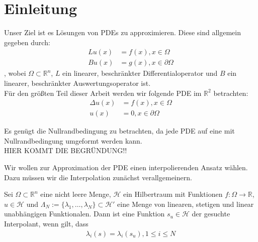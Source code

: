 \chapter{Einleitung}
\label{cha:Einleitung}


Unser Ziel ist es Lösungen von \acp{PDE} zu approximieren. Diese sind allgemein gegeben durch:
\begin{align*}
L u(x) &= f(x), x \in \Omega \\
B u(x) &= g(x), x \in \partial \Omega
\end{align*}
, wobei $\Omega \subset \mathbb{R}^n$, $L$ ein linearer, beschränkter Differentialoperator und $B$ ein linearer, beschränkter Auswertungsoperator ist.\\
Für den größten Teil dieser Arbeit werden wir folgende \ac{PDE} im $\mathbb{R}^2$ betrachten:
\begin{align*}
\Delta u(x) &= f(x), x \in \Omega \\
u(x) &= 0 , x \in \partial \Omega
\end{align*}

Es genügt die Nullrandbedingung zu betrachten, da jede \ac{PDE} auf eine mit Nullrandbedingung umgeformt werden kann.\\
HIER KOMMT DIE BEGRÜNDUNG!!

Wir wollen zur Approximation der \ac{PDE} einen interpolierenden Ansatz wählen. Dazu müssen wir die Interpolation zunächst verallgemeinern.

\begin{definition}
Sei $\Omega \subset \mathbb{R}^n$ eine nicht leere Menge, $\mathcal{H}$ ein Hilbertraum mit Funktionen $f:\Omega \rightarrow \mathbb{R}$, $u \in \mathcal{H}$  und $\Lambda_N := \{\lambda_1, \dots, \lambda_N\} \subset \mathcal{H}'$ eine Menge von linearen, stetigen und linear unabhängigen Funktionalen. Dann ist eine Funktion $s_u \in \mathcal{H}$ der gesuchte Interpolant, wenn gilt, dass
\begin{align*}
\lambda_i(s) = \lambda_i(s_u) , 1\le i \le N
\end{align*}
\end{definition}

